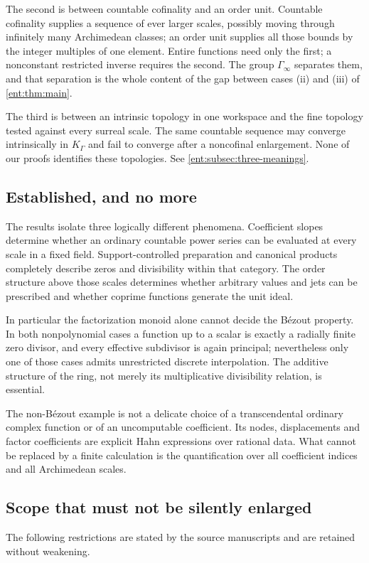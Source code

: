 \documentclass[11pt]{article}
\theoremstyle{plain}
\theoremstyle{plain}
\theoremstyle{plain}
\theoremstyle{definition}
\theoremstyle{definition}
\theoremstyle{definition}
\theoremstyle{definition}
\theoremstyle{remark}
\newcommand{\K}{K_\Gamma}\newcommand{\KD}{K_\Delta}
\begin{document}
The second is between countable cofinality and an order unit. Countable
cofinality supplies a sequence of ever larger scales, possibly moving through
infinitely many Archimedean classes; an order unit supplies all those bounds
by the integer multiples of one element. Entire functions need only the
first; a nonconstant restricted inverse requires the second. The group
$\Gamma_\infty$ separates them, and that separation is the whole content of
the gap between cases (ii) and (iii) of \cref{ent:thm:main}.

The third is between an intrinsic topology in one workspace and the fine
topology tested against every surreal scale. The same countable sequence may
converge intrinsically in $\K$ and fail to converge after a noncofinal
enlargement. None of our proofs identifies these topologies. See
\cref{ent:subsec:three-meanings}.

\subsection{Established, and no more}
The results isolate three logically different phenomena. Coefficient slopes
determine whether an ordinary countable power series can be evaluated at
every scale in a fixed field. Support-controlled preparation and canonical
products completely describe zeros and divisibility within that category. The
order structure above those scales determines whether arbitrary values and
jets can be prescribed and whether coprime functions generate the unit ideal.

In particular the factorization monoid alone cannot decide the B\'ezout
property. In both nonpolynomial cases a function up to a scalar is exactly a
radially finite zero divisor, and every effective subdivisor is again
principal; nevertheless only one of those cases admits unrestricted discrete
interpolation. The additive structure of the ring, not merely its
multiplicative divisibility relation, is essential.

The non-B\'ezout example is not a delicate choice of a transcendental
ordinary complex function or of an uncomputable coefficient. Its nodes,
displacements and factor coefficients are explicit Hahn expressions over
rational data. What cannot be replaced by a finite calculation is the
quantification over all coefficient indices and all Archimedean scales.

\subsection{Scope that must not be silently enlarged}
\label{ent:subsec:scope-limits}
The following restrictions are stated by the source manuscripts and are
retained without weakening.
\end{document}
